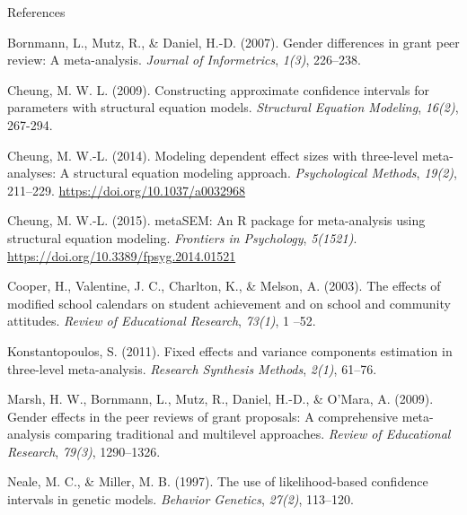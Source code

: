 \documentclass[11pt]{article}
\begin{document}
\begin{center}
References
\end{center}

Bornmann, L., Mutz, R., \& Daniel, H.-D. (2007). Gender differences in grant peer review: A meta-analysis. \emph{Journal of Informetrics}, \emph{1(3)}, 226–238. 

Cheung, M. W. L. (2009). Constructing approximate confidence intervals for parameters with structural equation models. \emph{Structural Equation Modeling}, \emph{16(2)}, 267-294. 

Cheung, M. W.-L. (2014). Modeling dependent effect sizes with three-level meta-analyses: A structural equation modeling approach. \emph{Psychological Methods}, \emph{19(2)}, 211–229. \url{https://doi.org/10.1037/a0032968}

Cheung, M. W.-L. (2015). metaSEM: An R package for meta-analysis using structural equation modeling. \emph{Frontiers in Psychology}, \emph{5(1521)}. \url{https://doi.org/10.3389/fpsyg.2014.01521}

Cooper, H., Valentine, J. C., Charlton, K., \& Melson, A. (2003). The effects of modified school calendars on student achievement and on school and community attitudes. \emph{Review of Educational Research}, \emph{73(1)}, 1 –52. 

Konstantopoulos, S. (2011). Fixed effects and variance components estimation in three-level meta-analysis. \emph{Research Synthesis Methods}, \emph{2(1)}, 61–76. 

Marsh, H. W., Bornmann, L., Mutz, R., Daniel, H.-D., \& O’Mara, A. (2009). Gender effects in the peer reviews of grant proposals: A comprehensive meta-analysis comparing traditional and multilevel approaches. \emph{Review of Educational Research}, \emph{79(3)}, 1290–1326. 

Neale, M. C., \& Miller, M. B. (1997). The use of likelihood-based confidence intervals in genetic models. \emph{Behavior Genetics}, \emph{27(2)}, 113–120. 
\end{document}
